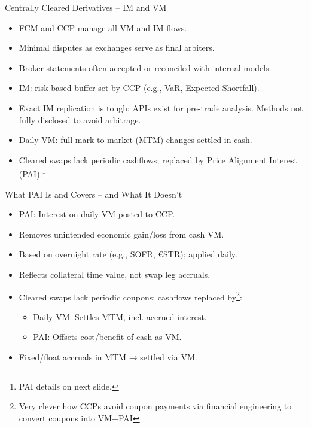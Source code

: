 \documentclass[handout, aspectratio=169]{beamer}
\begin{document}
\begin{frame}{Centrally Cleared Derivatives – IM and VM}
  \begin{itemize}
    \item FCM and CCP manage all VM and IM flows.
    \item Minimal disputes as exchanges serve as final arbiters.
    \item Broker statements often accepted or reconciled with internal models.
    \item IM: risk-based buffer set by CCP (e.g., VaR, Expected Shortfall).
    \item Exact IM replication is tough; APIs exist for pre-trade analysis. Methods not fully disclosed to avoid arbitrage.
    \item Daily VM: full mark-to-market (MTM) changes settled in cash.
    \item Cleared swaps lack periodic cashflows; replaced by Price Alignment Interest (PAI).\footnote{PAI details on next slide.}
  \end{itemize}
\end{frame}

\begin{frame}{What PAI Is and Covers – and What It Doesn’t}
  \begin{itemize}
    \item PAI: Interest on daily VM posted to CCP.
    \item Removes unintended economic gain/loss from cash VM.
    \item Based on overnight rate (e.g., SOFR, €STR); applied daily.
    \item Reflects collateral time value, not swap leg accruals.
    \item Cleared swaps lack periodic coupons; cashflows replaced by\footnote{Very clever how CCPs avoid coupon payments via financial engineering to convert coupons into VM+PAI}:
    \begin{itemize}
      \item Daily VM: Settles MTM, incl. accrued interest.
      \item PAI: Offsets cost/benefit of cash as VM.
    \end{itemize}
    \item Fixed/float accruals in MTM → settled via VM.
  \end{itemize}
\end{frame}
  
\end{document}
